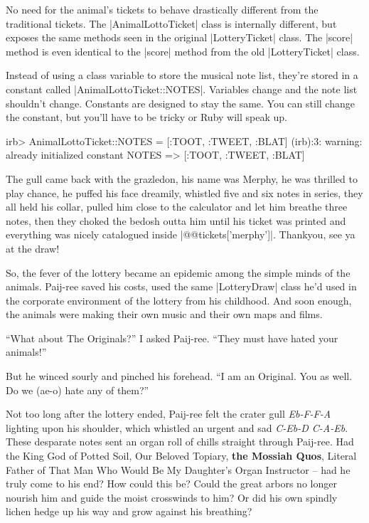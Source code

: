 \documentclass[12pt,twoside]{report}
\begin{document}
No need for the animal's tickets to behave drastically different from
the traditional tickets.  The
\rubyinline|AnimalLottoTicket| class is internally
different, but exposes the same methods seen in the original
\rubyinline|LotteryTicket| class. The
\rubyinline|score| method is even identical to the
\rubyinline|score| method from the old
\rubyinline|LotteryTicket| class.

Instead of using a class variable to store the musical note list,
they're stored in a constant called
\rubyinline|AnimalLottoTicket::NOTES|.  Variables
change and the note list shouldn't change.  Constants are designed to
stay the same.  You can still change the constant, but you'll have to
be tricky or Ruby will speak up.


\begin{consolecode}

 irb> AnimalLottoTicket::NOTES = [:TOOT, :TWEET, :BLAT]
 (irb):3: warning: already initialized constant NOTES
   => [:TOOT, :TWEET, :BLAT]

\end{consolecode}


The gull came back with the grazledon, his name was Merphy, he was
thrilled to play chance, he puffed his face dreamily, whistled five
and six notes in series, they all held his collar, pulled him close to
the calculator and let him breathe three notes, then they choked the
bedosh outta him until his ticket was printed and everything was
nicely catalogued inside
\rubyinline|@@tickets['merphy']|.  Thankyou, see ya at
the draw!

So, the fever of the lottery became an epidemic among the simple minds
of the animals.  Paij-ree saved his costs, used the same
\rubyinline|LotteryDraw| class he'd used in the
corporate environment of the lottery from his childhood.  And soon
enough, the animals were making their own music and their own maps and
films.

``What about The Originals?'' I asked Paij-ree.  ``They must have
hated your animals!''

But he winced sourly and pinched his forehead.  ``I am an Original.
You as well. Do we (ae-o) hate any of them?''

Not too long after the lottery ended, Paij-ree felt the crater gull
{\em Eb-F-F-A} lighting upon his shoulder, which whistled an urgent
and sad {\em C-Eb-D C-A-Eb}. These desparate notes sent an organ roll
of chills straight through Paij-ree.  Had the King God of Potted Soil,
Our Beloved Topiary, {\bf the Mossiah Quos}, Literal Father of That
Man Who Would Be My Daughter's Organ Instructor -- had he truly come
to his end? How could this be?  Could the great arbors no longer
nourish him and guide the moist crosswinds to him?  Or did his own
spindly lichen hedge up his way and grow against his breathing?
\end{document}
